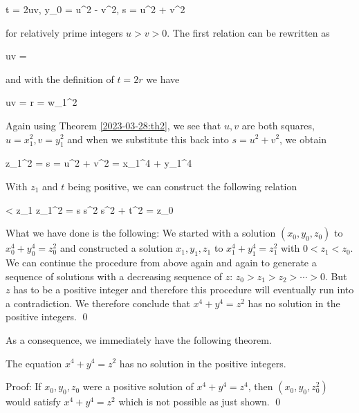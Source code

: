 \bee
t = 2uv, \quad y_0 = u^2 - v^2, \quad s = u^2 + v^2
\eee

for relatively prime integers $u > v > 0$. The first relation can be rewritten as

\bee
uv = 
\eee

and with the definition of $t = 2r$ we have 

\bee
uv = r = w_1^2
\eee

Again using Theorem \ref{2023-03-28:th2}, we see that $u, v$ are both squares, $u=x_1^2, v = y_1^2$ and when we substitute this back into $s = u^2 + v^2$, we obtain

\bee
z_1^2 = s = u^2 + v^2 = x_1^4 + y_1^4
\eee

With $z_1$ and $t$ being positive, we can construct the following relation

 < z_1 \leq z_1^2  = s \leq s^2 \leq s^2 + t^2 = z_0
\eee

What we have done is the following: We started with a solution $(x_0, y_0, z_0)$ to $x_0^4 + y_0^4 = z_0^2$ and constructed a solution $x_1, y_1, z_1$ to $x_1^4 + y_1^4 = z_1^2$ with $0 < z_1 < z_0$. We can continue the procedure from above again and again to generate a sequence of solutions with a decreasing sequence of $z$: $z_0 > z_1 > z_2 > \cdots > 0$. But $z$ has to be a positive integer and therefore this procedure will eventually run into a contradiction. We therefore conclude that $x^4 + y^4 = z^2$ has no solution in the positive integers. \qed

As a consequence, we immediately have the following theorem.

\begin{theorem}
    The equation $x^4 + y^4 = z^2$ has no solution in the positive integers.
\end{theorem}

Proof: If $x_0, y_0, z_0$ were a positive solution of $x^4 + y^4 = z^4$, then $(x_0, y_0, z_0^2)$ would satisfy $x^4 + y^4 =z^2$ which is not possible as just shown. \qed


